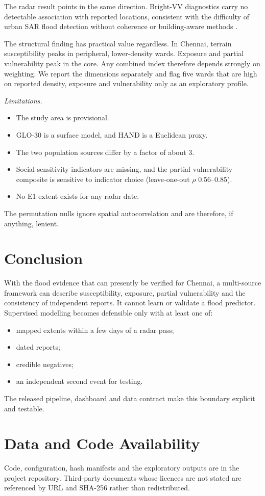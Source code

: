 \documentclass[conference]{IEEEtran}
\begin{document}
The radar result points in the same direction. Bright-VV diagnostics carry no detectable association with reported locations, consistent with the difficulty of urban SAR flood detection without coherence or building-aware methods \cite{mason2018urban,chini2019coherence}.

The structural finding has practical value regardless. In Chennai, terrain susceptibility peaks in peripheral, lower-density wards. Exposure and partial vulnerability peak in the core. Any combined index therefore depends strongly on weighting. We report the dimensions separately and flag five wards that are high on reported density, exposure and vulnerability only as an exploratory profile.

\emph{Limitations.}
\begin{itemize}
\item The study area is provisional.
\item GLO-30 is a surface model, and HAND is a Euclidean proxy.
\item The two population sources differ by a factor of about 3.
\item Social-sensitivity indicators are missing, and the partial vulnerability composite is sensitive to indicator choice (leave-one-out $\rho$ 0.56--0.85).
\item No E1 extent exists for any radar date.
\end{itemize}
The permutation nulls ignore spatial autocorrelation and are therefore, if anything, lenient.

\section{Conclusion}
With the flood evidence that can presently be verified for Chennai, a multi-source framework can describe susceptibility, exposure, partial vulnerability and the consistency of independent reports. It cannot learn or validate a flood predictor. Supervised modelling becomes defensible only with at least one of:
\begin{itemize}
\item mapped extents within a few days of a radar pass;
\item dated reports;
\item credible negatives;
\item an independent second event for testing.
\end{itemize}
The released pipeline, dashboard and data contract make this boundary explicit and testable.

\section*{Data and Code Availability}
Code, configuration, hash manifests and the exploratory outputs are in the project repository. Third-party documents whose licences are not stated are referenced by URL and SHA-256 rather than redistributed.



\end{document}
